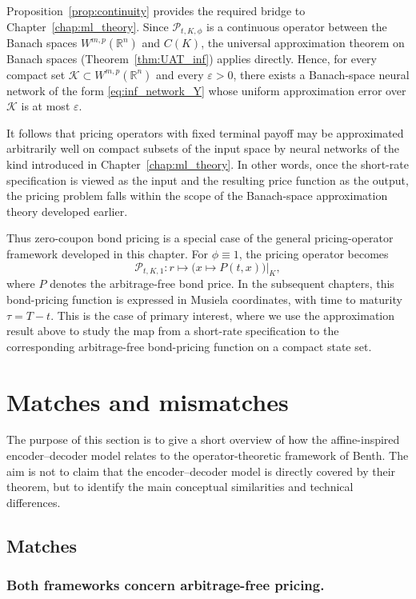 Proposition~\ref{prop:continuity} provides the required bridge to Chapter~\ref{chap:ml_theory}. Since $\mathcal{P}_{t,K,\phi}$ is a continuous operator between the Banach spaces $W^{m,p}(\mathbb{R}^n)$ and $C(K)$, the universal approximation theorem on Banach spaces (Theorem~\ref{thm:UAT_inf}) applies directly. Hence, for every compact set $\mathcal{K}\subset W^{m,p}(\mathbb{R}^n)$ and every $\varepsilon>0$, there exists a Banach-space neural network of the form \eqref{eq:inf_network_Y} whose uniform approximation error over $\mathcal{K}$ is at most $\varepsilon$.

It follows that pricing operators with fixed terminal payoff may be approximated arbitrarily well on compact subsets of the input space by neural networks of the kind introduced in Chapter~\ref{chap:ml_theory}. In other words, once the short-rate specification is viewed as the input and the resulting price function as the output, the pricing problem falls within the scope of the Banach-space approximation theory developed earlier.

Thus zero-coupon bond pricing is a special case of the general pricing-operator framework developed in this chapter. For $\phi\equiv 1$, the pricing operator becomes
\[
    \mathcal{P}_{t,K,1}: r \longmapsto \bigl(x\mapsto P(t,x)\bigr)\big|_K,
\]
where $P$ denotes the arbitrage-free bond price. In the subsequent chapters, this bond-pricing function is expressed in Musiela coordinates, with time to maturity $\tau=T-t$. This is the case of primary interest, where we use the approximation result above to study the map from a short-rate specification to the corresponding arbitrage-free bond-pricing function on a compact state set.


\chapter{Matches and mismatches}

The purpose of this section is to give a short overview of how the affine-inspired encoder--decoder model relates to the operator-theoretic framework of Benth. The aim is not to claim that the encoder--decoder model is directly covered by their theorem, but to identify the main conceptual similarities and technical differences.

\section{Matches}

\subsection{Both frameworks concern arbitrage-free pricing.}

